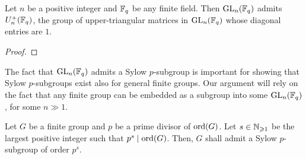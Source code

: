         \begin{lemma} \label{lemma: modular_general_linear_groups_admit_sylow_subgroups}
            Let $n$ be a positive integer and $\mathbb{F}_q$ be any finite field. Then $\mathrm{GL}_n(\mathbb{F}_q)$ admits $U^+_n(\mathbb{F}_q)$, the group of upper-triangular matrices in $\mathrm{GL}_n(\mathbb{F}_q)$ whose diagonal entries are $1$.
        \end{lemma}
            \begin{proof}
                
            \end{proof}
        The fact that $\mathrm{GL}_n(\mathbb{F}_q)$ admits a Sylow $p$-subgroup is important for showing that Sylow $p$-subgroups exist also for general finite groups. Our argument will rely on the fact that any finite group can be embedded as a subgroup into some $\mathrm{GL}_n(\mathbb{F}_q)$, for some $n \gg 1$. 
        \begin{theorem} \label{theorem: sylow_1_existence_of_sylow_subgroups}
            Let $G$ be a finite group and $p$ be a prime divisor of $\operatorname{ord}(G)$. Let $s \in \mathbb{N}_{\geqslant 1}$ be the largest positive integer such that $p^s \mid \operatorname{ord}(G)$. Then, $G$ shall admit a Sylow $p$-subgroup of order $p^s$.
        \end{theorem}
